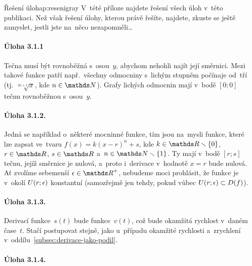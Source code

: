 \begin{chapterintro}{Řešení úloh}{ap:reseni}{gray}{}
    V~tété příloze najdete řešení všech úloh v~této publikaci. Než však řešení úlohy,
    kterou právě řešíte, najdete, zkuste se ještě zamyslet, jestli jste na~něco
    nezapomněli\ldots
\end{chapterintro}

\paragraph{Úloha 3.1.1}
Tečna musí být rovnoběžná s~osou~$y$, abychom nehohli najít její směrnici. Mezi
takové funkce patří např.\ všechny odmocniny s~lichým stupněm počínaje od~tří (tj.
$\sqrt[2n+1]{x}$, kde ${n \in \naturals}$). Grafy lichých odmocnin mají v~bodě
${[0; 0]}$ tečnu rovnoběžnou s~osou~$y$.

\paragraph{Úloha 3.1.2.}
Jedná se například o~některé mocninné funkce, tím jsou na~mysli funkce, které lze
zapsat ve~tvaru ${f(x) = k (x-r)^n + s}$, kde ${k \in \reals \smallsetminus \{0\}}$,
${r \in \reals}$, ${s \in \reals}$ a~${n \in \naturals \smallsetminus \{1\}}$.
Ty mají v~bodě ${[r; s]}$ tečnu, jejíž směrnice je nulová, a~proto i~derivace v~hodnotě
${x = r}$ bude nulová.
Ať zvolíme sebemenší ${\epsilon \in \positive\reals}$, nebudeme moci prohlásit, že
funkce je v~okolí ${U(r; \epsilon)}$ konstantní (samozřejmě jen tehdy, pokud
vůbec ${U(r; \epsilon) \subset D(f)}$).

\paragraph{Úloha 3.1.3.}
Derivací funkce~$s(t)$ bude funkce~$v(t)$, což bude okamžitá rychlost v~daném
čase~$t$. Stačí postupovat stejně, jako u~případu okamžité rychlosti a~zrychlení
v~oddílu~\ref{subsec:derivace-jako-podil}.

\paragraph{Úloha 3.1.4.}
